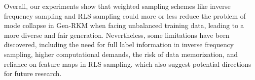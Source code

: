 Overall, our experiments show that weighted sampling schemes like inverse frequency sampling and RLS sampling could more or less reduce the problem of mode collapse in Gen-RKM when facing unbalanced training data, leading to a more diverse and fair generation. Nevertheless, some limitations have been discovered, including the need for full label information in inverse frequency sampling, higher computational demands, the risk of data memorization, and reliance on feature maps in RLS sampling, which also suggest potential directions for future research.





